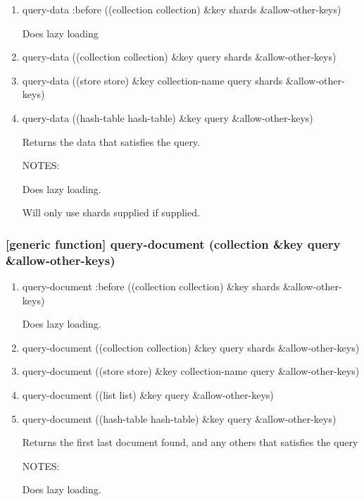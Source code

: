 \documentclass[11pt]{article}
\begin{document}
\begin{enumerate}
\item query-data :before ((collection collection) \&key shards \&allow-other-keys)
\label{sec:org80ec9dd}

Does lazy loading

\item query-data ((collection collection) \&key query shards \&allow-other-keys)
\label{sec:orgb2b0996}

\item query-data ((store store) \&key collection-name query shards \&allow-other-keys)
\label{sec:orgea7feb8}

\item query-data ((hash-table hash-table) \&key query \&allow-other-keys)
\label{sec:org2049acc}

Returns the data that satisfies the query.

NOTES:

Does lazy loading.

Will only use shards supplied if supplied.
\end{enumerate}

\subsubsection{[generic function] query-document (collection \&key query \&allow-other-keys)}
\label{sec:org918d775}

\begin{enumerate}
\item query-document :before ((collection collection) \&key shards \&allow-other-keys)
\label{sec:orge82e6cb}

Does lazy loading.

\item query-document ((collection collection) \&key query shards \&allow-other-keys)
\label{sec:org42227c7}

\item query-document ((store store) \&key collection-name query \&allow-other-keys)
\label{sec:org34a6141}

\item query-document ((list list) \&key query \&allow-other-keys)
\label{sec:org4ae3135}

\item query-document ((hash-table hash-table) \&key query \&allow-other-keys)
\label{sec:org83652dc}

Returns the first last document found, and any others that satisfies
the query

NOTES:

Does lazy loading.
\end{enumerate}
\end{document}
